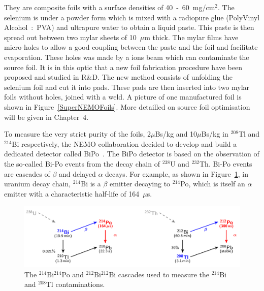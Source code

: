 \documentclass[main.tex]{subfiles}
\begin{document}
\NI They are composite foils with a surface densities of 40~-~60~mg/cm$^\text{2}$. The selenium is under a powder form which is mixed with a radiopure glue (PolyVinyl Alcohol~:~PVA) and ultrapure water to obtain a liquid paste. This paste is then spread out between two mylar sheets of 10~$\mu$m thick. The mylar films have micro-holes to allow a good coupling between the paste and the foil and facilitate evaporation. These holes was made by a ions beam which can contaminate the source foil. It is in this optic that a new foil fabrication procedure have been proposed and studied in R\&D. The new method consists of unfolding the selenium foil and cut it into pads. These pads are then inserted into two mylar foils without holes, joined with a weld. A picture of one manufactured foil is shown in Figure~\ref{SuperNEMOFoils}. More detailled on source foil optimisation will be given in Chapter~4.


\bigskip


\NI To measure the very strict purity of the foils, 2$\mu$Bs/kg and 10$\mu$Bs/kg in $^{\text{208}}$Tl and $^{\text{214}}$Bi respectively, the NEMO collaboration decided to develop and build a dedicated detector called BiPo~\cite{BiPoDetector}. The BiPo detector is based on the observation of the so-called Bi-Po events from the decay chain of $^{\text{238}}$U and $^{\text{232}}$Th. Bi-Po events are cascades of $\beta$ and delayed $\alpha$ decays. For example, as shown in Figure~\ref{BiPoDecayChain}, in uranium decay chain, $^{\text{214}}$Bi is a $\beta$ emitter decaying to $^{\text{214}}$Po, which is itself an $\alpha$ emitter with a characteristic half-life of 164~$\mu$s.


\begin{figure}[h!]
\begin{center}
\includegraphics[scale=0.33]{pictures/Chap3/BiPoDecayChain.png}
\caption{The $^{\text{214}}$Bi$^{\text{214}}$Po and $^{\text{212}}$Bi$^{\text{212}}$Bi cascades used to measure the $^{\text{214}}$Bi and $^{\text{208}}$Tl contaminations.}
\label{BiPoDecayChain}
\end{center}
\end{figure}
\end{document}
